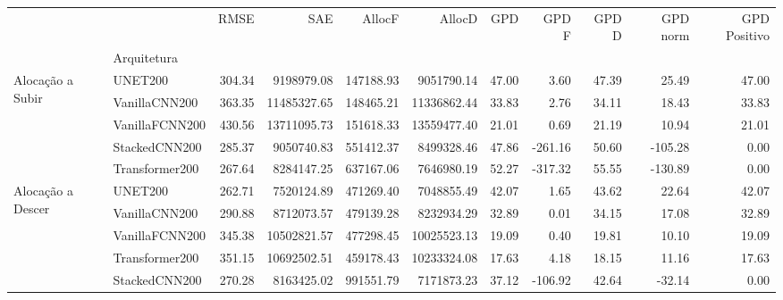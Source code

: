 \begin{tabular}{llrrrrrrrrr}
\toprule
 &  & RMSE & SAE & AllocF & AllocD & GPD & GPD F & GPD D & GPD norm & GPD Positivo \\
 & Arquitetura &  &  &  &  &  &  &  &  &  \\
\midrule
\multirow[t]{5}{*}{Alocação a Subir} & UNET200 & 304.34 & 9198979.08 & 147188.93 & 9051790.14 & 47.00 & 3.60 & 47.39 & 25.49 & 47.00 \\
 & VanillaCNN200 & 363.35 & 11485327.65 & 148465.21 & 11336862.44 & 33.83 & 2.76 & 34.11 & 18.43 & 33.83 \\
 & VanillaFCNN200 & 430.56 & 13711095.73 & 151618.33 & 13559477.40 & 21.01 & 0.69 & 21.19 & 10.94 & 21.01 \\
 & StackedCNN200 & 285.37 & 9050740.83 & 551412.37 & 8499328.46 & 47.86 & -261.16 & 50.60 & -105.28 & 0.00 \\
 & Transformer200 & 267.64 & 8284147.25 & 637167.06 & 7646980.19 & 52.27 & -317.32 & 55.55 & -130.89 & 0.00 \\
\cline{1-11}
\multirow[t]{5}{*}{Alocação a Descer} & UNET200 & 262.71 & 7520124.89 & 471269.40 & 7048855.49 & 42.07 & 1.65 & 43.62 & 22.64 & 42.07 \\
 & VanillaCNN200 & 290.88 & 8712073.57 & 479139.28 & 8232934.29 & 32.89 & 0.01 & 34.15 & 17.08 & 32.89 \\
 & VanillaFCNN200 & 345.38 & 10502821.57 & 477298.45 & 10025523.13 & 19.09 & 0.40 & 19.81 & 10.10 & 19.09 \\
 & Transformer200 & 351.15 & 10692502.51 & 459178.43 & 10233324.08 & 17.63 & 4.18 & 18.15 & 11.16 & 17.63 \\
 & StackedCNN200 & 270.28 & 8163425.02 & 991551.79 & 7171873.23 & 37.12 & -106.92 & 42.64 & -32.14 & 0.00 \\
\cline{1-11}
\bottomrule
\end{tabular}
